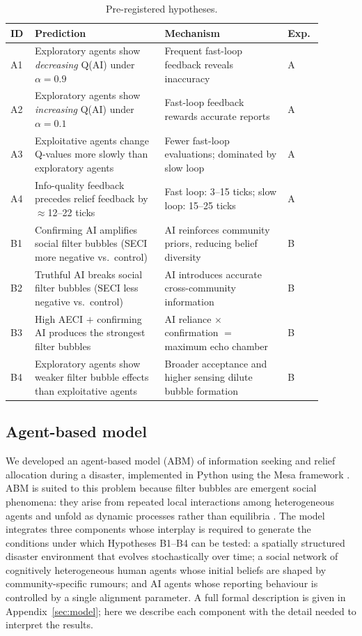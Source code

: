 \documentclass[pdflatex,sn-apa]{sn-jnl}%
\begin{document}
\begin{table}[h]
\centering
\caption{Pre-registered hypotheses.}
\label{tab:hypotheses}
\renewcommand{\arraystretch}{1.25}
\begin{tabular}{p{0.06\linewidth}p{0.38\linewidth}p{0.36\linewidth}p{0.09\linewidth}}
\hline
\textbf{ID} & \textbf{Prediction} & \textbf{Mechanism} & \textbf{Exp.} \\
\hline
A1 & Exploratory agents show \emph{decreasing} Q(AI) under $\alpha=0.9$
   & Frequent fast-loop feedback reveals inaccuracy & A \\
A2 & Exploratory agents show \emph{increasing} Q(AI) under $\alpha=0.1$
   & Fast-loop feedback rewards accurate reports & A \\
A3 & Exploitative agents change Q-values more slowly than exploratory agents
   & Fewer fast-loop evaluations; dominated by slow loop & A \\
A4 & Info-quality feedback precedes relief feedback by $\approx$12--22 ticks
   & Fast loop: 3--15 ticks; slow loop: 15--25 ticks & A \\
\hline
B1 & Confirming AI amplifies social filter bubbles (SECI more negative vs.\ control)
   & AI reinforces community priors, reducing belief diversity & B \\
B2 & Truthful AI breaks social filter bubbles (SECI less negative vs.\ control)
   & AI introduces accurate cross-community information & B \\
B3 & High AECI $+$ confirming AI produces the strongest filter bubbles
   & AI reliance $\times$ confirmation $=$ maximum echo chamber & B \\
B4 & Exploratory agents show weaker filter bubble effects than exploitative agents
   & Broader acceptance and higher sensing dilute bubble formation & B \\
\hline
\end{tabular}
\end{table}

\subsection*{Agent-based model}

We developed an agent-based model (ABM) of information seeking and
relief allocation during a disaster, implemented in Python using the
Mesa framework \citep{Mesa2020}.
ABM is suited to this problem because filter bubbles are emergent
social phenomena: they arise from repeated local interactions among
heterogeneous agents and unfold as dynamic processes rather than
equilibria \citep{Epstein2006,Bonabeau2002}.
The model integrates three components whose interplay is required to
generate the conditions under which Hypotheses B1--B4 can be
tested: a spatially structured disaster environment that evolves
stochastically over time; a social network of cognitively
heterogeneous human agents whose initial beliefs are shaped by
community-specific rumours; and AI agents whose reporting behaviour
is controlled by a single alignment parameter.
A full formal description is given in Appendix~\ref{sec:model}; here
we describe each component with the detail needed to interpret the
results.
\end{document}
